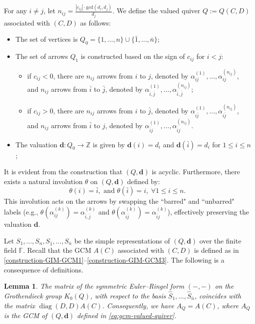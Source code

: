 \documentclass[12pt,reqno]{amsart}
\numberwithin{equation}{section}
\newcommand{\go}{{K_0}}
\newtheorem{lemma}[theorem]{Lemma}
\def \gcd{\mathrm{gcd}}
\begin{document}
	For any $i\neq j$, let $n_{ij}=\frac{|c_{ij}|\cdot\gcd(d_i,d_j)}{d_j}$. We define the valued quiver $Q:=Q(C,D)$ associated with $(C,D)$ as follows:
	\begin{itemize}
		\item The set of vertices is $Q_0=\{1,\ldots, n\}\cup\{\bar{1},\ldots,\bar{n}\}$;
		\item The set of arrows $Q_1$ is constructed based on the sign of $c_{ij}$ for $i<j$:
		\begin{itemize}
			\item if  $c_{ij}<0$, there are $n_{ij}$ arrows from $i$ to $j$, denoted by $\alpha_{ij}^{(1)},\ldots, \alpha_{ij}^{(n_{ij})}$,
			and  $n_{ij}$ arrows from $\bar{i}$ to $\bar{j}$, denoted by $\alpha_{\bar{i},\bar{j}}^{(1)},\ldots, \alpha_{\bar{i},\bar{j}}^{(n_{ij})}$;
			\item if  $c_{ij}>0$, there are $n_{ij}$ arrows from $i$ to $\bar{j}$, denoted by $\alpha_{i\bar{j}}^{(1)},\ldots,\alpha_{i\bar{j}}^{(n_{ij})}$,
			and  $n_{ij}$ arrows from $\bar{i}$ to $j$, denoted by $\alpha_{\bar{i}{j}}^{(1)},\ldots,\alpha_{\bar{i}{j}}^{(n_{ij})}$.
		\end{itemize}
		\item The valuation $\mathbf{d}:Q_0\rightarrow \mathbb{Z}$ is given by $\mathbf{d}(i)=d_i$ and $\mathbf{d}(\bar{i})=d_i$ for $1\leq i\leq n$;
	\end{itemize}
	It is evident from the construction that $(Q,\mathbf{d})$ is acyclic. Furthermore, there exists a natural involution $\theta$ on $(Q, \mathbf{d})$ defined by:
	\[\theta(i) = \bar{i}, \text{ and } \theta(\bar{i}) = i, \; \forall 1\leq i\leq n.\]
	This involution acts on the arrows by swapping the ``barred" and ``unbarred" labels (e.g., $\theta(\alpha_{ij}^{(k)}) = \alpha_{\bar{i},\bar{j}}^{(k)}$ and $\theta(\alpha_{i\bar{j}}^{(k)}) = \alpha_{\bar{i}j}^{(k)}$), effectively preserving the valuation $\mathbf{d}$.
	
	Let $S_1,\ldots, S_n,S_{\bar{1}},\ldots,S_{\bar{n}}$ be the simple representations of $(Q,\mathbf{d})$ over the finite field $\mathbb{F}$.
	Recall that the GCM $A(C)$ associated with $(C,D)$ is defined  as in \eqref{construction-GIM-GCM1}--\eqref{construction-GIM-GCM3}. The following is a consequence of definitions.
	\begin{lemma}\label{lem:Ringel-Euler-form-(Q,d)}
		The matrix of the symmetric Euler--Ringel form $(-,-)$ on the Grothendieck group $\go(Q)$, with respect to  the basis $\hat{S}_1,\ldots,\hat{S}_{\bar{n}}$, coincides with the matrix $\operatorname{diag}(D,D)A(C)$. Consequently, we have $A_Q=A(C)$, where $A_Q$ is the GCM of $(Q,\mathbf{d})$ defined in \eqref{eq:gcm-valued-quiver}.
	\end{lemma}
	
\end{document}
